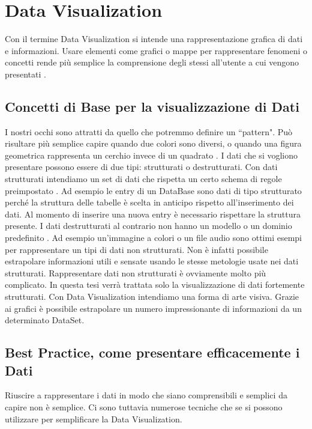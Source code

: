 \label{sub:climateChange}
\section{Data Visualization}
\noindent Con il termine Data Visualization si intende una rappresentazione grafica di dati e informazioni. Usare elementi come grafici o mappe per rappresentare fenomeni o concetti rende più semplice la comprensione degli stessi all'utente a cui vengono presentati \cite{dataVisual}.
\subsection{Concetti di Base per la visualizzazione di Dati}
\noindent I nostri occhi sono attratti da quello che potremmo definire un ``pattern". Può risultare più semplice capire quando due colori sono diversi, o quando una figura geometrica rappresenta un cerchio invece di un quadrato \cite{dataVisual}.\newline
I dati che si vogliono presentare possono essere di due tipi: strutturati o destrutturati.\newline
\noindent Con dati strutturati intendiamo un set di dati che rispetta un certo schema di regole preimpostato \cite{strucData}.\newline
Ad esempio le entry di un DataBase sono dati di tipo strutturato perché la struttura delle tabelle è scelta in anticipo rispetto all'inserimento dei dati. Al momento di inserire una nuova entry è necessario rispettare la struttura presente.\newline\newline
I dati destrutturati al contrario non hanno un modello o un dominio predefinito \cite{strucData}.\newline
Ad esempio un'immagine a colori o un file audio sono ottimi esempi per rappresentare un tipi di dati non strutturati. Non è infatti possibile estrapolare informazioni utili e sensate usando le stesse metologie usate nei dati strutturati.\newline
Rappresentare dati non strutturati è ovviamente molto più complicato. In questa tesi verrà trattata solo la visualizzazione di dati fortemente strutturati.\newline
\noindent Con Data Visualization intendiamo una forma di arte visiva.
Grazie ai grafici è possibile estrapolare un numero impressionante di informazioni da un determinato DataSet.

\subsection{Best Practice, come presentare efficacemente i Dati}
\noindent Riuscire a rappresentare i dati in modo che siano comprensibili e semplici da capire non è semplice. Ci sono tuttavia numerose tecniche che se si possono utilizzare per semplificare la Data Visualization.

